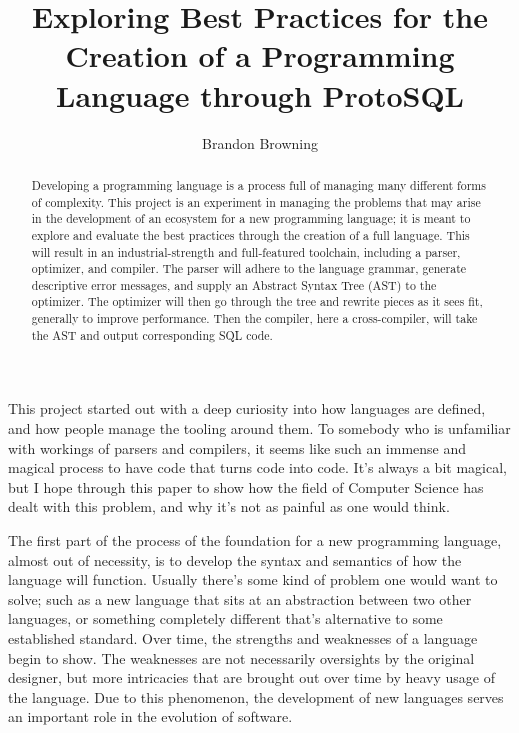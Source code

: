 \documentclass[titlepage]{article}
\begin{document}
	\title{Exploring Best Practices for the Creation of a Programming Language through ProtoSQL}
	\author{Brandon Browning}
	\maketitle

	\begin{abstract}
		Developing a programming language is a process full of managing many different forms of complexity.  This project is an experiment in managing the problems that may arise in the development of an ecosystem for a new programming language; it is meant to explore and evaluate the best practices through the creation of a full language.  This will result in an industrial-strength and full-featured toolchain, including a parser, optimizer, and compiler.  The parser will adhere to the language grammar, generate descriptive error messages, and supply an Abstract Syntax Tree (AST) to the optimizer.  The optimizer will then go through the tree and rewrite pieces as it sees fit, generally to improve performance.  Then the compiler, here a cross-compiler, will take the AST and output corresponding SQL code.
	\end{abstract}

	This project started out with a deep curiosity into how languages are defined, and how people manage the tooling around them.  To somebody who is unfamiliar with workings of parsers and compilers, it seems like such an immense and magical process to have code that turns code into code.  It's always a bit magical, but I hope through this paper to show how the field of Computer Science has dealt with this problem, and why it's not as painful as one would think.

	The first part of the process of the foundation for a new programming language, almost out of necessity, is to develop the syntax and semantics of how the language will function.  Usually there's some kind of problem one would want to solve; such as a new language that sits at an abstraction between two other languages, or something completely different that's alternative to some established standard.  Over time, the strengths and weaknesses of a language begin to show.  The weaknesses are not necessarily oversights by the original designer, but more intricacies that are brought out over time by heavy usage of the language.  Due to this phenomenon, the development of new languages serves an important role in the evolution of software.
\end{document}
